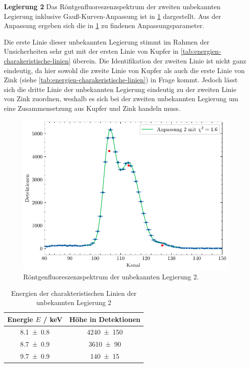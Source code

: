 \noindent\textbf{Legierung 2}\newline
Das Röntgenfluoreszenzspektrum der zweiten unbekannten Legierung inklusive Gauß-Kurven-Anpassung ist in \cref{fig:unbekannt2} dargestellt. Aus der Anpassung ergeben sich die
in \cref{tab:unbekannt2} zu findenen Anpassungsparameter.\par
Die erste Linie dieser unbekannten Legierung stimmt im Rahmen der Unsicherheiten sehr gut mit der ersten Linie von Kupfer in \cref{tab:energien-charakeristische-linien} überein.
Die Identifikation der zweiten Linie ist nicht ganz eindeutig, da hier sowohl die zweite Linie von Kupfer als auch die erste Linie von Zink (siehe \cref{tab:energien-charakeristische-linien})
in Frage kommt. Jedoch lässt sich die dritte Linie der unbekannten Legierung eindeutig zu der zweiten Linie von Zink zuordnen, weshalb es sich bei der zweiten unbekannten
Legierung um eine Zusammensetzung aus Kupfer und Zink handeln muss.
\begin{figure}[H]
	\centering
	\includegraphics[width=0.6\linewidth]{../figs/Unbekannt2.pdf}
	\caption{Röntgenfluoreszenzspektrum der unbekannten Legierung 2.}
	\label{fig:unbekannt2}
\end{figure}
\begin{table}[H]
    \centering
    \caption{Energien der charakteristischen Linien der unbekannten Legierung 2}
    \label{tab:unbekannt2}
    \begin{tabular}{c|c}
       Energie $E$ / \unit{\kilo\electronvolt} & Höhe in Detektionen \\
\hline
\num{8.1\pm 0.8} & \num{4240\pm 150} \\ 
\num{8.7\pm 0.9} & \num{3610\pm 90} \\ 
\num{9.7\pm 0.9} & \num{140\pm 15} \\ 

    \end{tabular}
\end{table}

